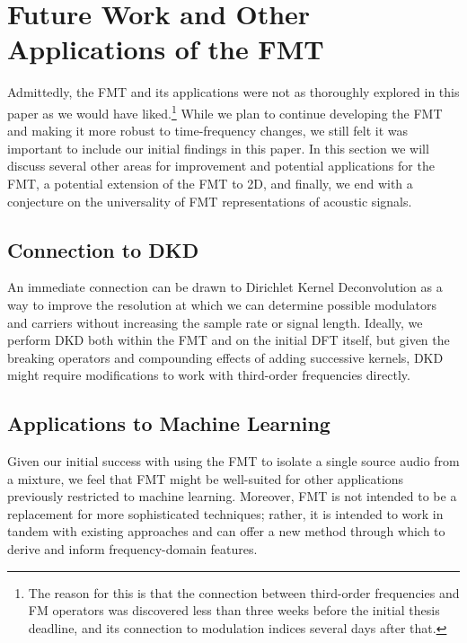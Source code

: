 \documentclass[11pt,twoside]{report}
\numberwithin{thm}{section}
\numberwithin{equation}{section}
\begin{document}
\section{Future Work and Other Applications of the FMT}
Admittedly, the FMT and its applications were not as thoroughly explored in this paper as we would have liked.\footnote{The reason for this is that the connection between third-order frequencies and FM operators was discovered less than three weeks before the initial thesis deadline, and its connection to modulation indices several days after that.} While we plan to continue developing the FMT and making it more robust to time-frequency changes, we still felt it was important to include our initial findings in this paper. In this section we will discuss several other areas for improvement and potential applications for the FMT, a potential extension of the FMT to 2D, and finally, we end with a conjecture on the universality of FMT representations of acoustic signals. 
\subsection{Connection to DKD}
\label{subsec:dkdfmt}
An immediate connection can be drawn to Dirichlet Kernel Deconvolution as a way to improve the resolution at which we can determine possible modulators and carriers without increasing the sample rate or signal length. Ideally, we perform DKD both within the FMT and on the initial DFT itself, but given the breaking operators and compounding effects of adding successive kernels, DKD might require modifications to work with third-order frequencies directly. 
\subsection{Applications to Machine Learning}
Given our initial success with using the FMT to isolate a single source audio from a mixture, we feel that FMT might be well-suited for other applications previously restricted to machine learning. Moreover, FMT is not intended to be a replacement for more sophisticated techniques; rather, it is intended to work in tandem with existing approaches and can offer a new method through which to derive and inform frequency-domain features. 
\end{document}
